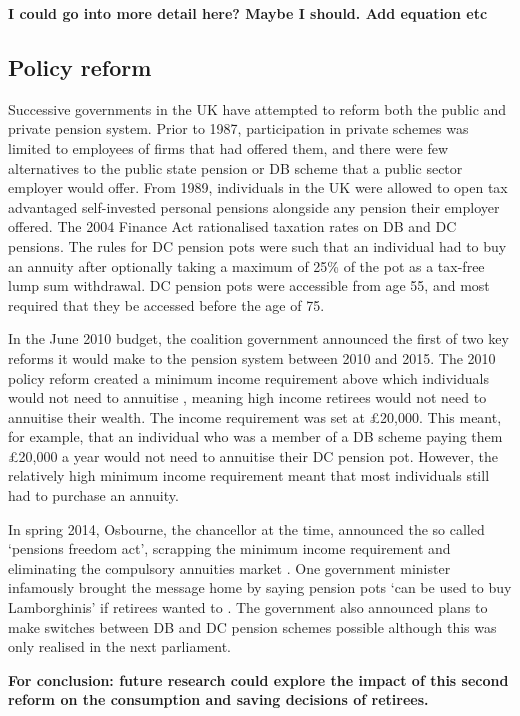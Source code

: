 \documentclass[12pt]{article}
\begin{document}
\textbf{I could go into more detail here? Maybe I should. Add equation etc}


\subsection{Policy reform}

Successive governments in the UK have attempted to reform both the public and
private pension system. Prior to 1987, participation in private schemes was
limited to employees of firms that had offered them, and there were few
alternatives to the public state pension or DB scheme that a public sector
employer would offer. From 1989, individuals in the UK were allowed to open tax
advantaged self-invested personal pensions alongside any pension their employer
offered. The 2004 Finance Act rationalised taxation rates on DB and DC pensions.
The rules for DC pension pots were such that an individual had to buy an annuity
after optionally taking a maximum of 25\% of the pot as a tax-free lump sum
withdrawal. DC pension pots were accessible from age 55, and most required that
they be accessed before the age of 75.

In the June 2010 budget, the coalition government announced the first of two key
reforms it would make to the pension system between 2010 and 2015. The 2010
policy reform created a minimum income requirement above which individuals would
not need to annuitise \citep{finance_act_hmt_2011}, meaning high income
retirees would not need to annuitise their wealth. The income requirement was
set at £20,000. This meant, for example, that an individual who was a member of
a DB scheme paying them £20,000 a year would not need to annuitise their DC
pension pot. However, the relatively high minimum income requirement meant that
most individuals still had to purchase an annuity.

In spring 2014, Osbourne, the chancellor at the time, announced the so called
`pensions freedom act', scrapping the minimum income requirement and eliminating
the compulsory annuities market \citep{pen_freedoms_hmt_2014}. One government
minister infamously brought the message home by saying pension pots `can be used
to buy Lamborghinis' if retirees wanted to \citep{guardian_lambos}. The
government also announced plans to make switches between DB and DC pension
schemes possible although this was only realised in the next parliament.

\textbf{For conclusion: future research could explore the impact of this second reform on the
    consumption and saving decisions of retirees.}
\end{document}
